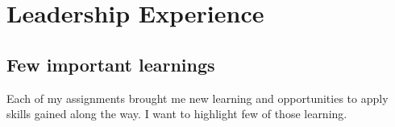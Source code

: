 \documentclass[11pt, a4paper]{awesome-cv}
\begin{document}
\newpage

\hypertarget{leadership-experience}{%
\section{Leadership Experience}\label{leadership-experience}}

\hypertarget{few-important-learnings}{%
\subsection{Few important learnings}\label{few-important-learnings}}

\footnotesize

Each of my assignments brought me new learning and opportunities to
apply skills gained along the way. I want to highlight few of those
learning.
\end{document}
